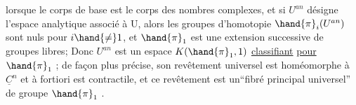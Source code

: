 
lorsque le corps de base est le corps des nombres complexes, et si $U^{an}$
désigne l'espace analytique associé à U, alors les groupes  d'homotopie
$\hand{\pi}_i(U^{an})$  sont nuls pour $i\hand{\neq}1$, et  $\hand{\pi}_1$  est une extension successive
de groupes libres;  Donc $U^{an}$  est
un espace $K(\hand{\pi}_1 ,1)$\hand{,} \uline{classifiant}  \uline{pour} $\hand{\pi}_1$ ;  de façon plus
précise, son revêtement universel  est  homéomorphe à $\underline{C}^n$  et à fortiori
est contractile, et ce revêtement est un``fibré principal universel'' de
groupe $\hand{\pi}_1$ .

